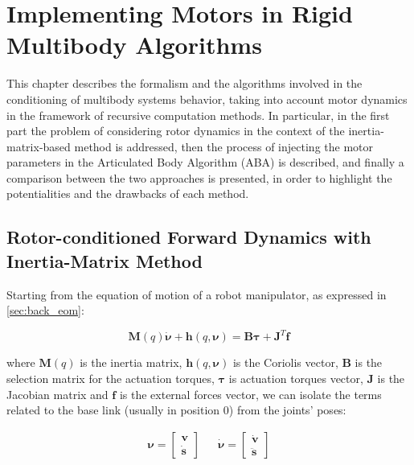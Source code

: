 \chapter{Implementing Motors in Rigid Multibody Algorithms}
\label{chp:contrib_ABA}

This chapter describes the formalism and the algorithms involved in the conditioning of multibody systems behavior, taking into account motor dynamics in the framework of recursive computation methods. In particular, in the first part the problem of considering rotor dynamics in the context of the inertia-matrix-based method is addressed, then the process of injecting the motor parameters in the Articulated Body Algorithm (\ac{ABA}) is described, and finally a comparison between the two approaches is presented, in order to highlight the potentialities and the drawbacks of each method.

\section{Rotor-conditioned Forward Dynamics with Inertia-Matrix Method}

Starting from the equation of motion of a robot manipulator, as expressed in \cref{sec:back_eom}:

\begin{equation}
    \mathbf{M}(q)\dot{\boldsymbol{\nu}} + \mathbf{h}(q,\boldsymbol{\nu}) = \mathbf{B}\boldsymbol{\tau} + \mathbf{J} ^T \mathbf{f}
\end{equation}

where $\mathbf{M}(q)$ is the inertia matrix, $\mathbf{h}(q,\boldsymbol{\nu})$ is the Coriolis vector, $\mathbf{B}$ is the selection matrix for the actuation torques, $\boldsymbol{\tau}$ is actuation torques vector, $\mathbf{J}$ is the Jacobian matrix and $\mathbf{f}$ is the external forces vector, we can isolate the terms related to the base link (usually in position 0) from the joints' poses:

\begin{align}
    \boldsymbol{\nu} =
    \begin{bmatrix}
        \mathrm{\mathbf{v}} \\
        \dot{\mathbf{s}}
    \end{bmatrix} &  &
    \dot{\boldsymbol{\nu}} =
    \begin{bmatrix}
        \dot{\mathrm{\mathbf{v}}} \\
        \ddot{\mathbf{s}}
    \end{bmatrix}
\end{align}

